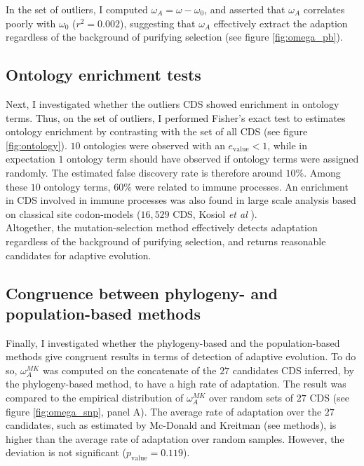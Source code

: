 \documentclass{article}
\begin{document}
	In the set of outliers, I computed  $\omega_A = \omega - \omega_0$, and asserted that $\omega_A$ correlates poorly with $ \omega_0$ ($r^2=0.002$), suggesting that $\omega_A$ effectively extract the adaption regardless of the background of purifying selection (see figure \ref{fig:omega_pb}). \\
	
	\subsection*{Ontology enrichment tests}
	Next, I investigated whether the outliers CDS showed enrichment in ontology terms. Thus, on the set of outliers, I performed Fisher's exact test to estimates ontology enrichment by contrasting with the set of all CDS (see figure \ref{fig:ontology}). $10$ ontologies were observed with an $e_{\mathrm{value}} <1$, while in expectation $1$ ontology term should have observed if ontology terms were assigned randomly. The estimated false discovery rate is therefore around $10 \%$. Among these $10$ ontology terms, $60 \%$ were related to immune processes. An enrichment in CDS involved in immune processes was also found in large scale analysis based on classical site codon-models ($16,529$ CDS, Kosiol \textit{et al} \cite{kosiol_patterns_2008}). \\
	
	Altogether, the mutation-selection method effectively detects adaptation regardless of the background of purifying selection, and returns reasonable candidates for adaptive evolution. 	

	\subsection*{Congruence between phylogeny- and population-based methods}
	Finally, I investigated whether the phylogeny-based and the population-based methods give congruent results in terms of detection of adaptive evolution. 
	To do so, $\omega_A^{MK}$ was computed on the concatenate of the $27$ candidates CDS inferred, by the phylogeny-based method, to have a high rate of adaptation. The result was compared to the empirical distribution of $\omega_A^{MK}$ over random sets of $27$ CDS (see figure \ref{fig:omega_snp}, panel A).
	The average rate of adaptation over the $27$ candidates, such as estimated by Mc-Donald and Kreitman (see methods), is higher than the average rate of adaptation over random samples. However, the deviation is not significant ($p_{\mathrm{value}}=0.119$).\\
	
\end{document}
